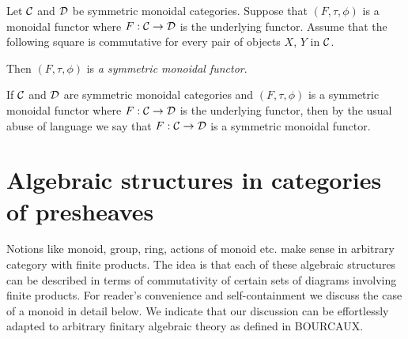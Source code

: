 \begin{definition}
Let ${\mathcal C}$ and ${\mathcal D}$ be symmetric monoidal categories. Suppose that $(F,\tau,\phi)$ is a monoidal functor where $F:{\mathcal C}\rightarrow {\mathcal D}$ is the underlying functor. Assume that the following square is commutative for every pair of objects $X$, $Y$ in ${\mathcal C}$.
\begin{center}
\end{center}
Then $(F,\tau,\phi)$ is \textit{a symmetric monoidal functor}.
\end{definition}
\noindent
If ${\mathcal C}$ and ${\mathcal D}$ are symmetric monoidal categories and $(F,\tau,\phi)$ is a symmetric monoidal functor where $F:{\mathcal C}\rightarrow {\mathcal D}$ is the underlying functor, then by the usual abuse of language we say that $F:{\mathcal C}\rightarrow {\mathcal D}$ is a symmetric monoidal functor.



























\section{Algebraic structures in categories of presheaves}
\noindent
Notions like  monoid, group, ring, actions of monoid etc. make sense in arbitrary category with finite products. The idea is that each of these algebraic structures can be described in terms of commutativity of certain sets of diagrams involving finite products. For reader's convenience and self-containment we discuss the case of a monoid in detail below. We indicate that our discussion can be effortlessly adapted to arbitrary finitary algebraic theory as defined in BOURCAUX.



